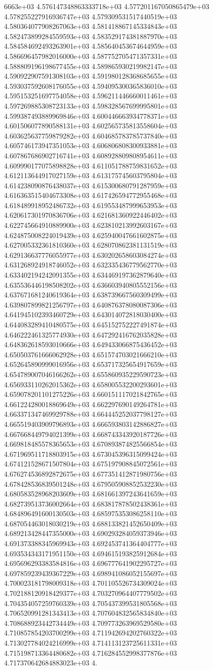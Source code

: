 6663e+03	4.576147348863333718e+03	4.577201167050865479e+03	4.578255227916936747e+03	4.579309531517440519e+03	4.580364077908267063e+03	4.581418867145334843e+03	4.582473899284559593e+03	4.583529174381887970e+03	4.584584692493263901e+03	4.585640453674644959e+03	4.586696457982016000e+03	4.587752705471357331e+03	4.588809196198677455e+03	4.589865930219982147e+03	4.590922907591308103e+03	4.591980128368685655e+03	4.593037592608176055e+03	4.594095300365836010e+03	4.595153251697754058e+03	4.596211446660011461e+03	4.597269885308723133e+03	4.598328567699995801e+03	4.599387493889969846e+03	4.600446663934778371e+03	4.601506077890588131e+03	4.602565735813558604e+03	4.603625637759879282e+03	4.604685783785737840e+03	4.605746173947351053e+03	4.606806808300933881e+03	4.607867686902716741e+03	4.608928809808954611e+03	4.609990177075898828e+03	4.611051788759831652e+03	4.612113644917027159e+03	4.613175745603795804e+03	4.614238090876438037e+03	4.615300680791287959e+03	4.616363515404673308e+03	4.617426594772955468e+03	4.618489918952486732e+03	4.619553487999653953e+03	4.620617301970836706e+03	4.621681360922446402e+03	4.622745664910889900e+03	4.623810213992603167e+03	4.624875008224019439e+03	4.625940047661602875e+03	4.627005332361810360e+03	4.628070862381131519e+03	4.629136637776055977e+03	4.630202658603084274e+03	4.631268924918746052e+03	4.632335436779562770e+03	4.633402194242091355e+03	4.634469197362879640e+03	4.635536446198508202e+03	4.636603940805552156e+03	4.637671681240619364e+03	4.638739667560309499e+03	4.639807899821256797e+03	4.640876378080087306e+03	4.641945102393460729e+03	4.643014072818030400e+03	4.644083289410480575e+03	4.645152752227491874e+03	4.646222461325774930e+03	4.647292416762035828e+03	4.648362618593010666e+03	4.649433066875436452e+03	4.650503761666062928e+03	4.651574703021666210e+03	4.652645890999016956e+03	4.653717325654917659e+03	4.654789007046166262e+03	4.655860935229590723e+03	4.656933110262015362e+03	4.658005532200293601e+03	4.659078201101275226e+03	4.660151117021842765e+03	4.661224280018869649e+03	4.662297690149264781e+03	4.663371347469929788e+03	4.664445252037798127e+03	4.665519403909796893e+03	4.666593803142886827e+03	4.667668449794021399e+03	4.668743343920187726e+03	4.669818485578365653e+03	4.670893874825566854e+03	4.671969511718803915e+03	4.673045396315099424e+03	4.674121528671507804e+03	4.675197908845072561e+03	4.676274536892872675e+03	4.677351412871980756e+03	4.678428536839501248e+03	4.679505908852532230e+03	4.680583528968203609e+03	4.681661397243641659e+03	4.682739513736002664e+03	4.683817878502438361e+03	4.684896491600130503e+03	4.685975353086258110e+03	4.687054463018030219e+03	4.688133821452650409e+03	4.689213428447355000e+03	4.690293284059373946e+03	4.691373388345969943e+03	4.692453741364404777e+03	4.693534343171951150e+03	4.694615193825912684e+03	4.695696293383584816e+03	4.696777641902295727e+03	4.697859239439367229e+03	4.698941086052155697e+03	4.700023181798009318e+03	4.701105526734309024e+03	4.702188120918429377e+03	4.703270964407779502e+03	4.704354057259760339e+03	4.705437399531805568e+03	4.706520991281343413e+03	4.707604832565834840e+03	4.708688923442734449e+03	4.709773263969529580e+03	4.710857854203700299e+03	4.711942694202760322e+03	4.713027784024216999e+03	4.714113123725611331e+03	4.715198713364480682e+03	4.716284552998377876e+03	4.717370642684883023e+03	4.